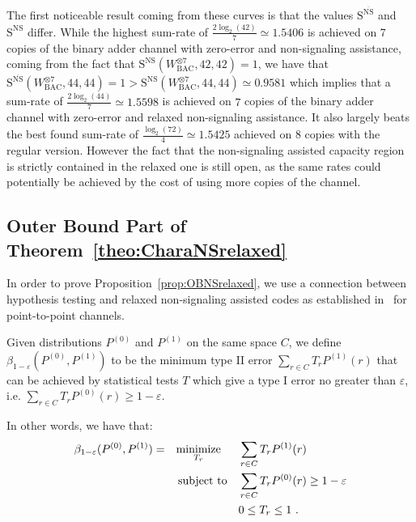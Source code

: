 \shorthandon{;}

The first noticeable result coming from these curves is that the values $\mathrm{S}^{\overline{\mathrm{NS}}}$ and $\mathrm{S}^{\mathrm{NS}}$ differ. While the highest sum-rate of $\frac{2\log_2(42)}{7} \simeq 1.5406$ is achieved on $7$ copies of the binary adder channel with zero-error and non-signaling assistance, coming from the fact that $\mathrm{S}^{\mathrm{NS}}(W^{\otimes 7}_{\mathrm{BAC}},42,42)=1$, we have that $\mathrm{S}^{\overline{\mathrm{NS}}}(W^{\otimes 7}_{\mathrm{BAC}},44,44)=1>\mathrm{S}^{\mathrm{NS}}(W^{\otimes 7}_{\mathrm{BAC}},44,44) \simeq 0.9581$ which implies that a sum-rate of $\frac{2\log_2(44)}{7} \simeq 1.5598$ is achieved on $7$ copies of the binary adder channel with zero-error and relaxed non-signaling assistance. It also largely beats the best found sum-rate of $\frac{\log_2(72)}{4} \simeq 1.5425$ achieved on $8$ copies with the regular version. However the fact that the non-signaling assisted capacity region is strictly contained in the relaxed one is still open, as the same rates could potentially be achieved by the cost of using more copies of the channel.
  
  \subsection{Outer Bound Part of Theorem~\ref{theo:CharaNSrelaxed}}
In order to prove Proposition~\ref{prop:OBNSrelaxed}, we use a connection between hypothesis testing and relaxed non-signaling assisted codes as established in~\cite{Matthews12} for point-to-point channels.

\begin{definition}
  \label{defi:beta}
  Given distributions $P^{(0)}$ and  $P^{(1)}$ on the same space $C$, we define $\beta_{1-\varepsilon}(P^{(0)},P^{(1)})$ to be the minimum type II error $\sum_{r \in C} T_rP^{(1)}(r)$ that can be achieved by statistical tests $T$ which give a type I error no greater than $\varepsilon$, i.e. $\sum_{r \in C} T_rP^{(0)}(r) \geq 1-\varepsilon$.

  In other words, we have that:
  \begin{equation}
    \begin{aligned}
      \beta_{1-\varepsilon}(P^{(0)},P^{(1)}) = &&&\underset{T_r}{\operatorname{\text{minimize}}} &&\sum_{r \in C} T_rP^{(1)}(r)\\
      &&&\operatorname{\text{subject to}} &&\sum_{r \in C} T_rP^{(0)}(r) \geq 1-\varepsilon\\
      &&&&& 0 \leq T_r \leq 1 \ .
    \end{aligned}
  \end{equation}
\end{definition}

